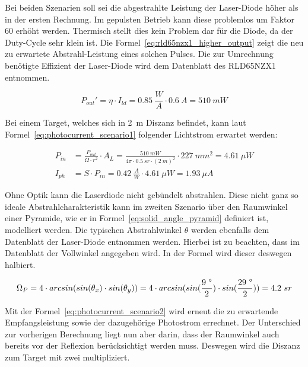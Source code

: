 Bei beiden Szenarien soll sei die abgestrahlte Leistung der Laser-Diode höher als in der ersten Rechnung. Im gepulsten
Betrieb kann diese problemlos um Faktor 60 erhöht werden. Thermisch stellt dies kein Problem dar für die Diode, da
der Duty-Cycle sehr klein ist. Die Formel~\ref{eq:rld65nzx1_higher_output} zeigt die neu zu erwartete Abstrahl-Leistung
eines solchen Pulses. Die zur Umrechnung benötigte Effizient der Laser-Diode wird dem Datenblatt des RLD65NZX1 entnommen.
\cite{rohm2019rld65nzx1_datasheet}

\begin{equation}\label{eq:rld65nzx1_higher_output}
    P_{out}' = \eta \cdot I_{ld} = 0.85~\frac{W}{A} \cdot 0.6~A = 510~mW
\end{equation}

Bei einem Target, welches sich in 2~m Diszanz befindet, kann laut Formel~\ref{eq:photocurrent_scenario1} folgender
Lichtstrom erwartet werden:

\begin{equation}\label{eq:photocurrent_scenario1}
    \begin{split}
        P_{in} &= \frac{P_{out}}{\Omega \cdot r^2} \cdot A_{L} = \frac{510~mW}{4\pi \cdot 0.5~sr \cdot (2~m)^2} \cdot 227~mm^2 = 4.61~\mu W\\
        I_{ph} &= S \cdot P_{in} = 0.42~\frac{A}{W} \cdot 4.61~\mu W = 1.93~\mu A
    \end{split}
\end{equation}
\myequations{}

Ohne Optik kann die Laserdiode nicht gebündelt abstrahlen. Diese nicht ganz so ideale Abstrahlcharakteristik kann im
zweiten Szenario über den Raumwinkel einer Pyramide, wie er in Formel~\ref{eq:solid_angle_pyramid} definiert ist,
modelliert werden. Die typischen Abstrahlwinkel $\theta$ werden ebenfalls dem Datenblatt der Laser-Diode
entnommen werden. Hierbei ist zu beachten, dass im Datenblatt der Vollwinkel angegeben wird. In der Formel wird dieser
deswegen halbiert.

\begin{equation}\label{eq:solid_angle_pyramid}
    \Omega_{P} = 4 \cdot arcsin(sin(\theta_x) \cdot sin(\theta_y)) =  4 \cdot arcsin(sin(\frac{9~\degree}{2} ) \cdot sin(\frac{29~\degree}{2})) = 4.2~sr
\end{equation}

Mit der Formel~\ref{eq:photocurrent_scenario2} wird erneut die zu erwartende Empfangsleistung sowie der dazugehörige
Photostrom errechnet. Der Unterschied zur vorherigen Berechnung liegt nun aber darin, dass der Raumwinkel auch bereits
vor der Reflexion berücksichtigt werden muss. Deswegen wird die Diszanz zum Target mit zwei multipliziert.

